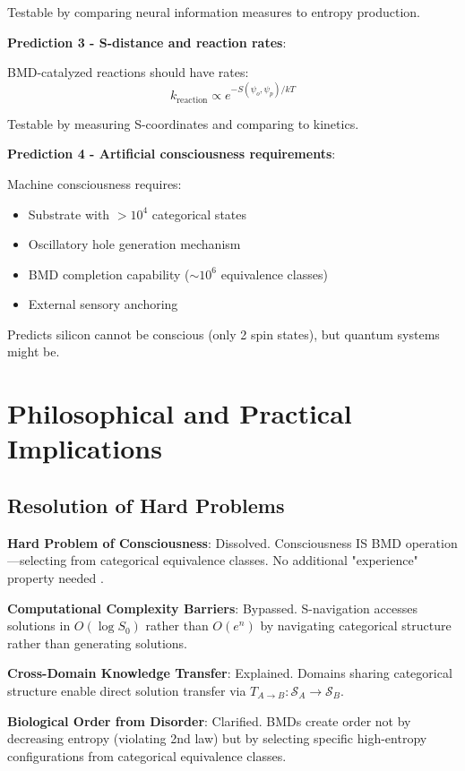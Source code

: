 \documentclass[12pt,a4paper]{article}
\begin{document}
Testable by comparing neural information measures to entropy production.

\textbf{Prediction 3 - S-distance and reaction rates}:

BMD-catalyzed reactions should have rates:
\begin{equation}
k_{\text{reaction}} \propto e^{-S(\psi_o,\psi_p)/kT}
\end{equation}

Testable by measuring S-coordinates and comparing to kinetics.

\textbf{Prediction 4 - Artificial consciousness requirements}:

Machine consciousness requires:
\begin{itemize}
\item Substrate with $>10^4$ categorical states
\item Oscillatory hole generation mechanism  
\item BMD completion capability ($\sim 10^6$ equivalence classes)
\item External sensory anchoring
\end{itemize}

Predicts silicon cannot be conscious (only 2 spin states), but quantum systems might be.

\section{Philosophical and Practical Implications}

\subsection{Resolution of Hard Problems}

\textbf{Hard Problem of Consciousness}: Dissolved. Consciousness IS BMD operation—selecting from categorical equivalence classes. No additional "experience" property needed \cite{sachikonye2024consciousness}.

\textbf{Computational Complexity Barriers}: Bypassed. S-navigation accesses solutions in $O(\log S_0)$ rather than $O(e^n)$ by navigating categorical structure rather than generating solutions.

\textbf{Cross-Domain Knowledge Transfer}: Explained. Domains sharing categorical structure enable direct solution transfer via $T_{A \to B}: \mathcal{S}_A \to \mathcal{S}_B$.

\textbf{Biological Order from Disorder}: Clarified. BMDs create order not by decreasing entropy (violating 2nd law) but by selecting specific high-entropy configurations from categorical equivalence classes.
\end{document}
